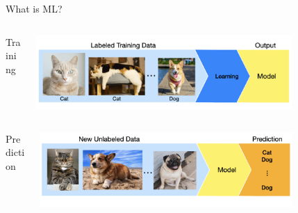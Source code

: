 \documentclass[11pt,compress,t,notes=noshow, xcolor=table]{beamer}
\begin{document}
\begin{vbframe}{What is ML?}
\begin{columns}    
\begin{column}{0.08\textwidth} 
\begin{center}
\item Training
\end{center}
\end{column}
\begin{column}{0.9\textwidth} 
\begin{center}
  \includegraphics[width = 0.8\textwidth]{slides/ml-basics/figure_man/nutshell-ml-basics-catdog-learning.png} 
\end{center}
\end{column}
\end{columns}
\begin{columns}
\begin{column}{0.08\textwidth} 
\begin{center}
Prediction
\end{center}
\end{column}
\begin{column}{0.9\textwidth} 
\begin{center}
  \includegraphics[width = 0.8\textwidth]{slides/ml-basics/figure_man/nutshell-ml-basics-catdog-prediction.png} 
\end{center}
\end{column}
\end{columns}

\end{vbframe}
\end{document}
